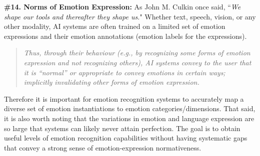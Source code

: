 \documentclass{clv3}
\begin{document}

\noindent \textbf{\#14. Norms of Emotion Expression:}
As John M. Culkin once said, ``\textit{We shape our tools and thereafter they shape us.}"
Whether text, speech, vision, or any other modality, AI systems are often trained on a limited set of emotion expressions and their emotion annotations (emotion labels for the expressions).\\[-20pt]
\begin{quote}
\textit{Thus, through their behaviour (e.g., by recognizing some forms of emotion expression and not recognizing others), AI systems convey to the user that it is “normal” or appropriate to convey emotions in certain ways; implicitly invalidating other forms of emotion expression.}\\[-15pt]
\end{quote}
Therefore it is important for emotion recognition systems to accurately map a diverse set of emotion instantiations to emotion categories/dimensions. That said, it is also worth noting that the variations in emotion and language expression are so large that systems can likely never attain perfection. 
The goal is to obtain useful levels of emotion recognition capabilities without having systematic gaps that convey a strong sense of emotion-expression normativeness.
\end{document}
